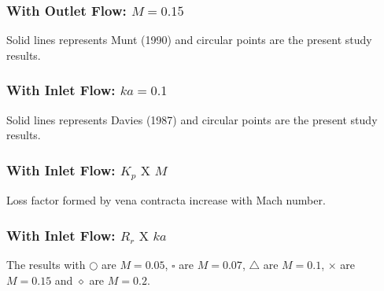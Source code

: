 \documentclass[dvipsnames,12pt]{beamer}
\begin{document}
\begin{frame}
\frametitle{With Outlet Flow: $M = 0.15$ }
\begin{minipage}[t][][t]{0.45\textwidth}
    \begin{figure}
  \centering

\end{figure}
\end{minipage}
\hfill
\begin{minipage}[t]{0.45\textwidth}
\begin{figure}
    
\end{figure}
\end{minipage}
\centering
Solid lines represents Munt (1990) and circular points are the present study results.
\end{frame}

\begin{frame}
\frametitle{With Inlet Flow: $ka = 0.1$}
\begin{minipage}[t][][t]{0.48\textwidth}
    \begin{figure}
  \centering

\end{figure}
\end{minipage}
\hfill
\begin{minipage}[t]{0.48\textwidth}
\begin{figure}
    
\end{figure}
\end{minipage}
\centering
Solid lines represents Davies (1987) and circular points are the present study results.
\end{frame}

\begin{frame}
\frametitle{With Inlet Flow: $K_{p} \text{ X } M$}
\begin{figure}
  \centering

\end{figure}
\centering
Loss factor formed by vena contracta increase with Mach number.
\end{frame}

\begin{frame}
\frametitle{With Inlet Flow: $R_{r} \text{ X } ka$}
\begin{figure}
  \centering

\end{figure}
\centering
The results with $\bigcirc$ are $M = 0.05$, $\square$ are $M = 0.07$, $\bigtriangleup$ are $M = 0.1$, $\times$ are $M = 0.15$ and $\diamond$ are $M = 0.2$.
\end{frame}
\end{document}
